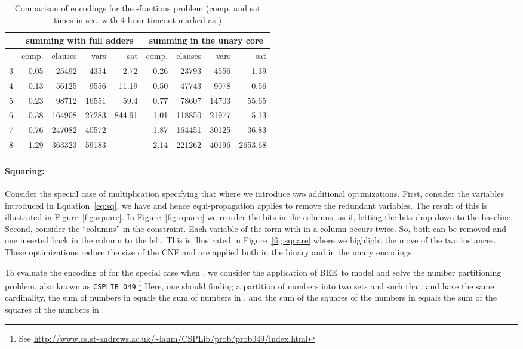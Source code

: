 \documentclass[runningheads,a4paper]{llncs}
\newcommand{\bee}{\textsf{BEE}}
\begin{document}
\begin{table}[t]\small
  \centering
  \begin{tabular}{|l|rrrr|rrrr|}
\hline
           & \multicolumn{4}{c|}{summing with full adders} 
           & \multicolumn{4}{c|}{summing in the unary core}\\
\hline
       &comp.&clauses&vars&sat&comp.&clauses&vars&sat\\
\hline
  3 & 0.05&25492 & 4354&2.72   & 0.26&23793 &4556 &1.39\\
  4 & 0.13&56125 & 9556&11.19  & 0.50&47743 &9078 &0.56\\
  5 & 0.23&98712 &16551&59.4   & 0.77&78607 &14703&55.65\\
  6 & 0.38&164908&27283&844.91 & 1.01&118850&21977&5.13\\
  7 & 0.76&247082&40572&~~ & 1.87&164451&30125&36.83\\
  8 & 1.29&363323&59183&~~~& 2.14&221262&40196&2653.68\\
\hline
\end{tabular}

\caption{Comparison of encodings for the -fractions problem
  (comp. and sat times in sec. with 4 hour timeout marked as )}
\label{tab:fractions}
\end{table}


\paragraph{\bf Squaring:~~}

Consider the special case of multiplication
 specifying that  where
we introduce two additional optimizations. First, consider the
variables  introduced in Equation~\ref{eq:sq}, we
have  and hence equi-propagation applies to remove the
redundant variables. The result of this is illustrated in
Figure~\ref{fig:square}. In
Figure~\ref{fig:square} we reorder the bits in the
columns, as if, letting the bits drop down to the baseline.  Second,
consider the ``columns'' in the
 constraint. Each
variable of the form  with  in a column occurs
twice. So, both can be removed and one inserted back in the column to
the left. This is illustrated in
Figure~\ref{fig:square} where we highlight the
move of the two  instances. These optimizations reduce the
size of the CNF and are applied both in the binary and in the unary
encodings. 



To evaluate the encoding of  for the
special case when , we consider the application of \bee\
to model and solve the number partitioning problem, also known as
\texttt{CSPLIB 049}.\footnote{See
  \url{http://www.cs.st-andrews.ac.uk/~ianm/CSPLib/prob/prob049/index.html}}
Here, one should finding a partition of numbers  into
two sets  and  such that:  and  have the same cardinality,
the sum of numbers in   equals the sum of numbers in , and
the sum of the squares of the numbers in  equals the sum of the
squares of the numbers in . 
\end{document}
